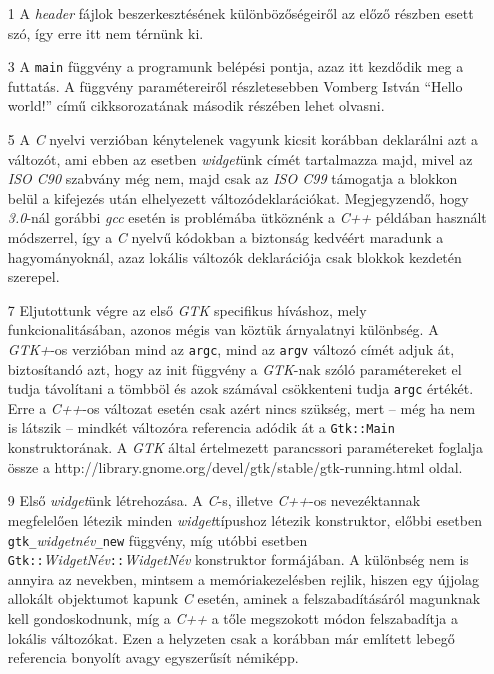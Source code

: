\documentclass[a4paper,10pt]{article}
\begin{document}
\begin{enumerate}
 \item[1] A \textit{header} fájlok beszerkesztésének különbözőségeiről az előző részben esett szó, így erre itt nem térnünk ki.

 \item[3] A \texttt{main} függvény a programunk belépési pontja, azaz itt kezdődik meg a futtatás. A függvény paramétereiről részletesebben Vomberg István ``Hello world!'' című cikksorozatának második részében lehet olvasni.

 \item[5] A \textit{C} nyelvi verzióban kénytelenek vagyunk kicsit korábban deklarálni azt a változót, ami ebben az esetben \textit{widget}ünk címét tartalmazza majd, mivel az \textit{ISO C90} szabvány még nem, majd csak az \textit{ISO C99} támogatja a blokkon belül a kifejezés után elhelyezett változódeklarációkat. Megjegyzendő, hogy \textit{3.0}-nál gorábbi \textit{gcc} esetén is problémába ütköznénk a \textit{C++} példában használt módszerrel, így a \textit{C} nyelvű kódokban a biztonság kedvéért maradunk a hagyományoknál, azaz lokális változók deklarációja csak blokkok kezdetén szerepel.

 \item[7] Eljutottunk végre az első \textit{GTK} specifikus híváshoz, mely funkcionalitásában, azonos mégis van köztük árnyalatnyi különbség. A \textit{GTK+}-os verzióban mind az \texttt{argc}, mind az \texttt{argv} változó címét adjuk át, biztosítandó azt, hogy az init függvény a \textit{GTK}-nak szóló paramétereket el tudja távolítani a tömbböl és azok számával csökkenteni tudja \texttt{argc} értékét. Erre a \textit{C++}-os változat esetén csak azért nincs szükség, mert -- még ha nem is látszik -- mindkét változóra referencia adódik át a \texttt{Gtk::Main} konstruktorának. A \textit{GTK} által értelmezett parancssori paramétereket foglalja össze a http://library.gnome.org/devel/gtk/stable/gtk-running.html oldal.

 \item[9] Első \textit{widget}ünk létrehozása. A \textit{C}-s, illetve \textit{C++}-os nevezéktannak megfelelően létezik minden \textit{widget}típushoz létezik konstruktor, előbbi esetben \texttt{gtk\_}\textit{widgetnév}\texttt{\_new} függvény, míg utóbbi esetben \texttt{Gtk::}\textit{WidgetNév}\texttt{::}\textit{WidgetNév} konstruktor formájában. A különbség nem is annyira az nevekben, mintsem a memóriakezelésben rejlik, hiszen egy újjolag allokált objektumot kapunk \textit{C} esetén, aminek a felszabadításáról magunknak kell gondoskodnunk, míg a \textit{C++} a tőle megszokott módon felszabadítja a lokális változókat. Ezen a helyzeten csak a korábban már említett lebegő referencia bonyolít avagy egyszerűsít némiképp.


\end{enumerate}
\end{document}
